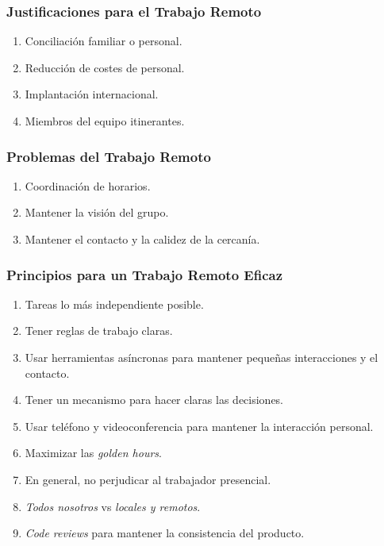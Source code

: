 \documentclass[a4paper,t,xcolor=pst,dvips]{beamer}
\begin{document}
\begin{frame}[c]
	\frametitle{Justificaciones para el Trabajo Remoto}
	\begin{enumerate}[<+->]
        \item Conciliación familiar o personal.
        \item Reducción de costes de personal.
        \item Implantación internacional.
        \item Miembros del equipo itinerantes.
	\end{enumerate}
\end{frame}

\begin{frame}[c]
	\frametitle{Problemas del Trabajo Remoto}
	\begin{enumerate}[<+->]
        \item Coordinación de horarios.
        \item Mantener la visión del grupo.
        \item Mantener el contacto y la calidez de la cercanía.
	\end{enumerate}
\end{frame}

\begin{frame}[c]
	\frametitle{Principios para un Trabajo Remoto Eficaz}
	\begin{enumerate}[<+->]
        \item Tareas lo más independiente posible.
        \item Tener reglas de trabajo claras.
        \item Usar herramientas asíncronas para mantener pequeñas interacciones y el contacto.
        \item Tener un mecanismo para hacer claras las decisiones.
        \item Usar teléfono y videoconferencia para mantener la interacción personal.
        \item Maximizar las \emph{golden hours}.
        \item En general, no perjudicar al trabajador presencial.
        \item \emph{Todos nosotros} vs \emph{locales y remotos}.
        \item \emph{Code reviews} para mantener la consistencia del producto.
	\end{enumerate}
\end{frame}

\end{document}

